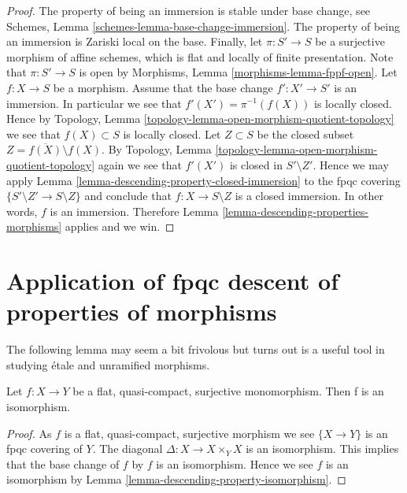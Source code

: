\begin{proof}
The property of being an immersion is stable under base change,
see Schemes, Lemma \ref{schemes-lemma-base-change-immersion}.
The property of being an immersion is Zariski local on the base.
Finally, let
$\pi : S' \to S$ be a surjective morphism of affine schemes,
which is flat and locally of finite presentation.
Note that $\pi : S' \to S$ is open by
Morphisms, Lemma \ref{morphisms-lemma-fppf-open}.
Let $f : X \to S$ be a morphism.
Assume that the base change $f' : X' \to S'$ is an immersion.
In particular we see that $f'(X') = \pi^{-1}(f(X))$ is locally closed.
Hence by Topology, Lemma \ref{topology-lemma-open-morphism-quotient-topology}
we see that $f(X) \subset S$
is locally closed. Let $Z \subset S$ be
the closed subset $Z = \overline{f(X)} \setminus f(X)$.
By Topology, Lemma \ref{topology-lemma-open-morphism-quotient-topology}
again we see that $f'(X')$ is closed in $S' \setminus Z'$.
Hence we may apply Lemma \ref{lemma-descending-property-closed-immersion}
to the fpqc covering $\{S' \setminus Z' \to S \setminus Z\}$
and conclude that $f : X \to S \setminus Z$ is a closed
immersion. In other words, $f$ is an immersion.
Therefore Lemma \ref{lemma-descending-properties-morphisms} applies and we win.
\end{proof}






\section{Application of fpqc descent of properties of morphisms}
\label{section-application-descending-properties-morphisms}

\noindent
The following lemma may seem a bit frivolous but turns out is a useful
tool in studying \'etale and unramified morphisms.

\begin{lemma}
\label{lemma-flat-surjective-quasi-compact-monomorphism-isomorphism}
Let $f : X \to Y$ be a flat, quasi-compact, surjective monomorphism.
Then f is an isomorphism.
\end{lemma}

\begin{proof}
As $f$ is a flat, quasi-compact, surjective morphism
we see $\{X \to Y\}$ is an fpqc covering of $Y$.
The diagonal $\Delta : X \to X \times_Y X$ is an isomorphism.
This implies that the base change of $f$ by $f$ is an
isomorphism. Hence we see $f$ is an isomorphism by
Lemma \ref{lemma-descending-property-isomorphism}.
\end{proof}

